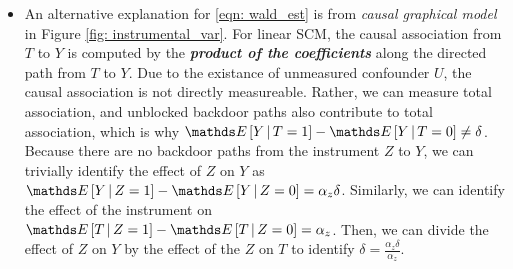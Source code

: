 \documentclass[11pt]{article}
\begin{document}
\begin{itemize}
\item An alternative explanation for \eqref{eqn: wald_est} is from \emph{causal graphical model} in Figure \ref{fig: instrumental_var}. For linear SCM, the causal association from $T$ to $Y$ is computed by the \emph{\textbf{product of the coefficients}} along the directed path from $T$ to $Y$. Due to the existance of unmeasured confounder $U$, the causal association is not directly measureable. Rather, we can measure total association, and unblocked backdoor paths also contribute to total association, which is why $\E{}{Y\,|\,T=1} - \E{}{Y\,|\,T=0} \neq \delta$. Because there are no backdoor paths from the instrument $Z$ to $Y$, we can trivially identify the effect of $Z$ on $Y$ as $\E{}{Y \,|\, Z = 1} - \E{}{Y \,|\, Z = 0} = \alpha_{z}\delta$. Similarly, we can identify the effect of the instrument on $\E{}{T\,|\, Z = 1} - \E{}{T\,|\, Z = 0} = \alpha_z$. Then, we can divide the effect of $Z$ on $Y$ by the effect of the $Z$ on $T$ to identify $\delta= \frac{ \alpha_{z}\delta}{\alpha_z}$.
\end{itemize}
\end{document}
